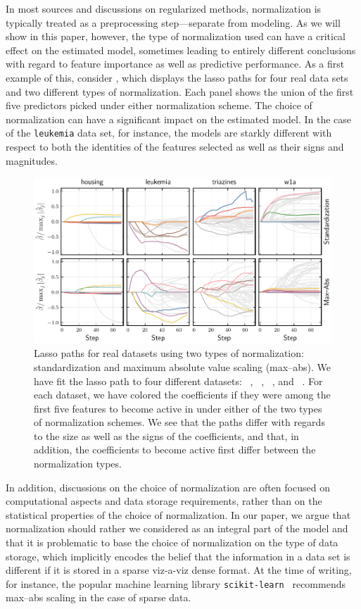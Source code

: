 In most sources and discussions on regularized methods, normalization is typically treated
as a preprocessing step---separate from modeling. As we will show in this paper, however,
the type of normalization used can have a critical effect on the estimated model, sometimes
leading to entirely different conclusions with regard to feature importance as well as
predictive performance. As a first example of this, consider ,
which displays the lasso paths for four real data sets and two different types of
normalization. Each panel shows the union of the first five predictors picked under either
normalization scheme. The choice of normalization can have a significant impact on the
estimated model. In the case of the \texttt{leukemia} data set, for instance, the models
are starkly different with respect to both the identities of the features selected as well
as their signs and magnitudes.

\begin{figure}[bpt]
  \centering
  \includegraphics[]{plots/realdata_paths.pdf}
  \caption{%
    Lasso paths for real datasets using two types of normalization: standardization and maximum absolute value scaling (max--abs). We have fit the lasso path to four different datasets: ~\citep{harrison1978}, ~\citep{golub1999}, ~\citep{king}, and ~\citep{platt1998}. For each dataset, we have colored the coefficients if they were among the first five features to become active in under either of the two types of normalization schemes. We see that the paths differ with regards to the size as well as the signs of the coefficients, and that, in addition, the coefficients to become active first differ between the normalization types.
  }
  \label{fig:realdata-paths}
\end{figure}

In addition, discussions on the choice of normalization are often focused on computational
aspects and data storage requirements, rather than on the statistical properties of the
choice of normalization. In our paper, we argue that normalization should rather we
considered as an integral part of the model and that it is problematic to base the choice
of normalization on the type of data storage, which implicitly encodes the belief that the
information in a data set is different if it is stored in a sparse viz-a-viz dense format.
At the time of writing, for instance, the popular machine learning library
\texttt{scikit-learn}~\citep{scikit-learndevelopers2024} recommends max--abs scaling in the
case of sparse data.
